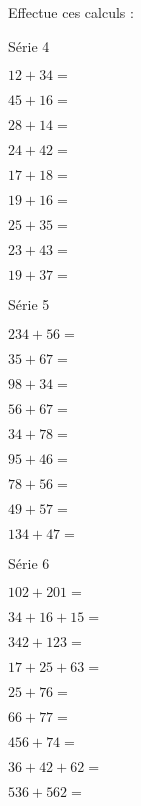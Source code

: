 \begin{myenumerate}
\begin{multicols}{3}
\end{multicols}
\item Effectue ces calculs :
\begin{multicols}{3}
\begin{center}
Série 4
\end{center}
\begin{Myenumerate}
\item$12+34=$\dotfill
\item$45+16=$\dotfill
\item$28+14=$\dotfill
\item$24+42=$\dotfill
\item$17+18=$\dotfill
\item$19+16=$\dotfill
\item$25+35=$\dotfill
\item$23+43=$\dotfill
\item$19+37=$\dotfill
\end{Myenumerate}
\par
\begin{center}
Série 5
\end{center}
\begin{Myenumerate}
\item$234+56=$\dotfill
\item$35+67=$\dotfill
\item$98+34=$\dotfill
\item$56+67=$\dotfill
\item$34+78=$\dotfill
\item$95+46=$\dotfill
\item$78+56=$\dotfill
\item$49+57=$\dotfill
\item$134+47=$\dotfill
\end{Myenumerate}
\par
\begin{center}
Série 6
\end{center}
\begin{Myenumerate}
\item$102+201=$\dotfill
\item$34+16+15=$\dotfill
\item$342+123=$\dotfill
\item$17+25+63=$\dotfill
\item$25+76=$\dotfill
\item$66+77=$\dotfill
\item$456+74=$\dotfill
\item$36+42+62=$\dotfill
\item$536+562=$\dotfill
\end{Myenumerate}
\end{multicols}
\end{myenumerate}

